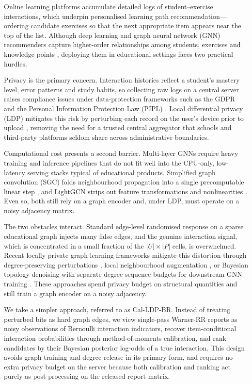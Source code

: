 \documentclass[pdflatex,sn-basic,Numbered]{sn-jnl}
\theoremstyle{plain}
\theoremstyle{remark}
\theoremstyle{definition}
\begin{document}
Online learning platforms accumulate detailed logs of student--exercise interactions, which underpin personalised learning path recommendation---ordering candidate exercises so that the next appropriate item appears near the top of the list. Although deep learning and graph neural network (GNN) recommenders capture higher-order relationships among students, exercises and knowledge points \cite{kipf2017gcn,wu2021gnnsurvey,ying2018pinsage,zhang2019survey}, deploying them in educational settings faces two practical hurdles.

Privacy is the primary concern. Interaction histories reflect a student's mastery level, error patterns and study habits, so collecting raw logs on a central server raises compliance issues under data-protection frameworks such as the GDPR and the Personal Information Protection Law (PIPL) \cite{himeur2022review}. Local differential privacy (LDP) mitigates this risk by perturbing each record on the user's device prior to upload \cite{duchi2013local,kairouz2016discrete,wang2017ldp}, removing the need for a trusted central aggregator that schools and third-party platforms seldom share across administrative boundaries.

Computational cost presents a second barrier. Multi-layer GNNs require heavy training and inference pipelines that do not fit well into the CPU-only, low-latency serving stacks typical of educational products. Simplified graph convolution (SGC) folds neighbourhood propagation into a single precomputable linear step \cite{wu2019sgc}, and LightGCN strips out feature transformations and nonlinearities \cite{he2020lightgcn}. Even so, both still rely on a graph encoder and, under LDP, must operate on a noisy adjacency matrix.

The two obstacles interact. Standard edge-level randomised response \cite{warner1965rr} on a sparse educational graph injects many false edges, and the genuine interaction signal, which is concentrated in a small fraction of the $|U|\times|P|$ cells, is overwhelmed. Recent locally private graph learning frameworks mitigate this distortion through degree-preserving perturbations \cite{hidano2024degree}, local neighbourhood augmentation \cite{pei2024privacy}, or Bayesian topology denoising with separate degree-sequence budgets for downstream GNN training \cite{zhu2023blink}. These approaches spend privacy budget on structural quantities and still train a graph encoder on a noisy adjacency.

We take a simpler approach, referred to as Cal-LDP-BR. Instead of treating perturbed bits as hard graph edges, we view single-pass Warner-RR reports as noisy observations of Bernoulli interaction indicators, recover item-conditional interaction probabilities through method-of-moments calibration, and rank candidates by their Bayesian posterior log-odds of a true interaction. This design avoids graph training and degree release in its primary form, and requires no extra privacy budget on the server because both calibration and ranking act purely as post-processing on the released report matrix.
\end{document}
